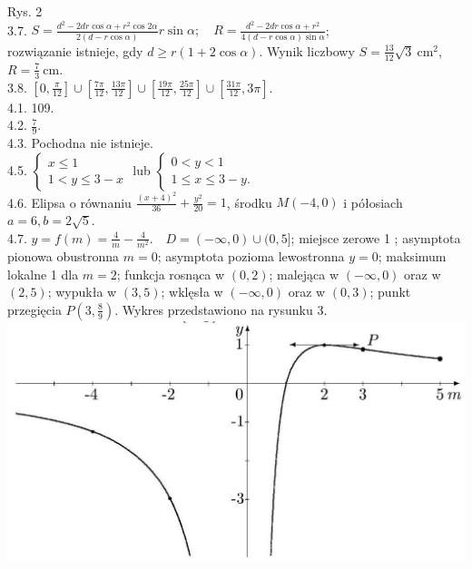 \documentclass[10pt]{article}
\begin{document}
Rys. 2\\
3.7. $S=\frac{d^{2}-2 d r \cos \alpha+r^{2} \cos 2 \alpha}{2(d-r \cos \alpha)} r \sin \alpha ; \quad R=\frac{d^{2}-2 d r \cos \alpha+r^{2}}{4(d-r \cos \alpha) \sin \alpha}$;\\
rozwiązanie istnieje, gdy $d \geq r(1+2 \cos \alpha)$. Wynik liczbowy $S=\frac{13}{12} \sqrt{3} \mathrm{~cm}^{2}$, $R=\frac{7}{3} \mathrm{~cm}$.\\
3.8. $\left[0, \frac{\pi}{12}\right] \cup\left[\frac{7 \pi}{12}, \frac{13 \pi}{12}\right] \cup\left[\frac{19 \pi}{12}, \frac{25 \pi}{12}\right] \cup\left[\frac{31 \pi}{12}, 3 \pi\right]$.\\
4.1. 109.\\
4.2. $\frac{7}{9}$.\\
4.3. Pochodna nie istnieje.\\
4.5. $\left\{\begin{array}{l}x \leq 1 \\ 1<y \leq 3-x\end{array}\right.$ lub $\left\{\begin{array}{l}0<y<1 \\ 1 \leq x \leq 3-y .\end{array}\right.$\\
4.6. Elipsa o równaniu $\frac{(x+4)^{2}}{36}+\frac{y^{2}}{20}=1$, środku $M(-4,0)$ i półosiach $a=6, b=2 \sqrt{5}$.\\
4.7. $y=f(m)=\frac{4}{m}-\frac{4}{m^{2}} . \quad D=(-\infty, 0) \cup(0,5]$; miejsce zerowe 1 ; asymptota pionowa obustronna $m=0$; asymptota pozioma lewostronna $y=0$; maksimum lokalne 1 dla $m=2$; funkcja rosnąca w $(0,2)$; malejąca w $(-\infty, 0)$ oraz w $(2,5)$; wypukła w $(3,5)$; wklęsła w $(-\infty, 0)$ oraz w $(0,3)$; punkt przegięcia $P\left(3, \frac{8}{9}\right)$. Wykres przedstawiono na rysunku 3.\\
\includegraphics[max width=\textwidth, center]{2024_11_16_fe5b564401bf7db98894g-055(1)}
\end{document}
